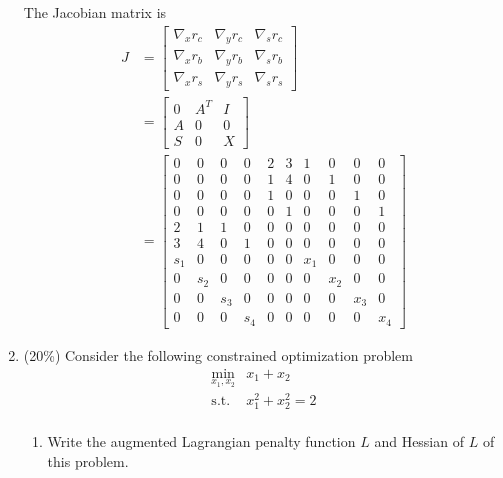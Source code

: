 \documentclass[a4paper,10pt]{article}
\begin{document}
\begin{enumerate}
{The Jacobian matrix is
\begin{align}
    J &= \begin{bmatrix} \nabla_x r_c & \nabla_y r_c & \nabla_s r_c \\ \nabla_x r_b & \nabla_y r_b & \nabla_s r_b \\ \nabla_x r_s & \nabla_y r_s & \nabla_s r_s \end{bmatrix} \\
    &= \begin{bmatrix} 0 & A^T & I \\ A & 0 & 0 \\ S & 0 & X \end{bmatrix} \\ 
    &= \begin{bmatrix} 
        0 & 0 & 0 & 0 & 2 & 3 & 1 & 0 & 0 & 0 \\
        0 & 0 & 0 & 0 & 1 & 4 & 0 & 1 & 0 & 0 \\
        0 & 0 & 0 & 0 & 1 & 0 & 0 & 0 & 1 & 0 \\ 
        0 & 0 & 0 & 0 & 0 & 1 & 0 & 0 & 0 & 1 \\
        2 & 1 & 1 & 0 & 0 & 0 & 0 & 0 & 0 & 0 \\ 
        3 & 4 & 0 & 1 & 0 & 0 & 0 & 0 & 0 & 0 \\ 
        s_1 & 0 & 0 & 0 & 0 & 0 & x_1 & 0 & 0 & 0 \\
        0 & s_2 & 0 & 0 & 0 & 0 & 0 & x_2 & 0 & 0 \\
        0 & 0 & s_3 & 0 & 0 & 0 & 0 & 0 & x_3 & 0 \\
        0 & 0 & 0 & s_4 & 0 & 0 & 0 & 0 & 0 & x_4
    \end{bmatrix}
\end{align}
}

\item (20\%) Consider the following constrained optimization problem
    \begin{equation}\label{(4)}
        \begin{array}{cc}
            \displaystyle\min_{x_1,x_2} & x_1 + x_2 \\
            \mbox{s.t.} & x_1^2 + x_2^2 = 2 \\
        \end{array}
    \end{equation}

    \begin{enumerate}
        \item Write the augmented Lagrangian penalty function $L$ and Hessian of $L$ of this problem. 
        

\end{enumerate}
\end{enumerate}
\end{document}
